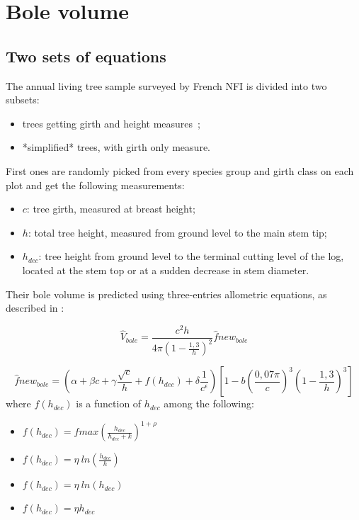 \chapter{Bole volume\label{chap::bole_v}}

\section{Two sets of equations}

The annual living tree sample surveyed by French NFI is divided into two subsets:  

\begin{itemize}
	\item trees getting girth and height measures ;
	\item *simplified* trees, with girth only measure.
\end{itemize}

First ones are randomly picked from every species group and girth class on each plot and get the following measurements:  

\begin{itemize}
	\item \( c \): tree girth, measured at breast height;
	\item \( h \): total tree height, measured from ground level to the main stem tip;
	\item \( h_{dec} \): tree height from ground level to the terminal cutting level of the log, located at the stem top or at a sudden decrease in stem diameter.
\end{itemize}

Their bole volume is predicted using three-entries allometric equations, as described in \cite{Morneau2016}:  

\begin{equation}
\hat V_{bole} = \frac{c^2 h}{4 \pi \left( 1 - \frac{1{,}3}{h} \right)^2} \hat fnew_{bole}
\label{eq::fnew}
\end{equation}

\[ \hat fnew_{bole} = \left( \alpha + \beta c + \gamma \frac{\sqrt{c}}{h} + f(h_{dec}) + \delta \frac{1}{c^\epsilon} \right) \left[ 1 - b \left( \frac{0{,}07 \pi}{c} \right)^3 \left( 1 - \frac{1{,}3}{h} \right)^3 \right] \]
where \( f(h_{dec}) \) is a function of \( h_{dec} \) among the following:  

\begin{itemize}
	\item \( f(h_{dec}) = fmax \left( \frac{h_{dec}}{h_{dec} + k} \right)^{1 + \rho} \)
	\item \( f(h_{dec}) = \eta ~ln\left( \frac{h_{dec}}{h} \right) \)
	\item \( f(h_{dec}) = \eta ~ln\left( h_{dec} \right) \)
	\item \( f(h_{dec}) = \eta h_{dec} \)
\end{itemize}

